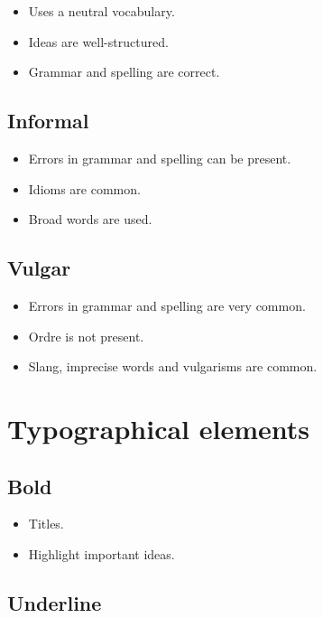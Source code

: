 \documentclass{article}
\begin{document}
\begin{itemize}
    \item Uses a neutral vocabulary.
    \item Ideas are well-structured.
    \item Grammar and spelling are correct.
\end{itemize}

\subsection*{Informal}

\begin{itemize}
    \item Errors in grammar and spelling can be present.
    \item Idioms are common.
    \item Broad words are used.
\end{itemize}

\subsection*{Vulgar}

\begin{itemize}
    \item Errors in grammar and spelling are very common.
    \item Ordre is not present.
    \item Slang, imprecise words and vulgarisms are common.
\end{itemize}

\section*{Typographical elements}

\subsection*{Bold}

\begin{itemize}
    \item Titles.
    \item Highlight important ideas.
\end{itemize}

\subsection*{Underline}
\end{document}

